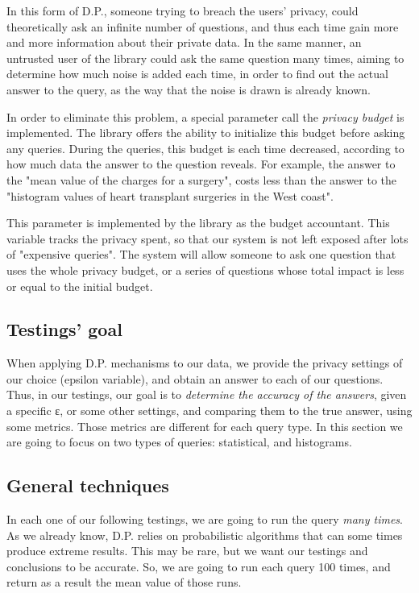 In this form of D.P., someone trying to breach the users' privacy, could theoretically ask an infinite number of questions, and thus each time gain more and more information about their private data. In the same manner, an untrusted user of the library could ask the same question many times, aiming to determine how much noise is added each time, in order to find out the actual answer to the query, as the way that the noise is drawn is already known.

In order to eliminate this problem, a special parameter call the \emph{privacy budget} is implemented. The library offers the ability to initialize this budget before asking any queries. During the queries, this budget is each time decreased, according to how much data the answer to the question reveals. For example, the answer to the "mean value of the charges for a surgery", costs less than the answer to the "histogram values of heart transplant surgeries in the West coast".

This parameter is implemented by the library as the budget accountant. This variable tracks the privacy spent, so that our system is not left exposed after lots of "expensive queries". The system will allow someone to ask one question that uses the whole privacy budget, or a series of questions whose total impact is less or equal to the initial budget.

\subsection{Testings' goal}

When applying D.P. mechanisms to our data, we provide the privacy settings of our choice (epsilon variable), and obtain an answer to each of our questions. Thus, in our testings, our goal is to \emph{determine the accuracy of the answers}, given a specific ε, or some other settings, and comparing them to the true answer, using some metrics. Those metrics are different for each query type. In this section we are going to focus on two types of queries: statistical, and histograms.

\subsection{General techniques}
In each one of our following testings, we are going to run the query \emph{many times}. As we already know, D.P. relies on probabilistic algorithms that can some times produce extreme results. This may be rare, but we want our testings and conclusions to be accurate. So, we are going to run each query 100 times, and return as a result the mean value of those runs.

